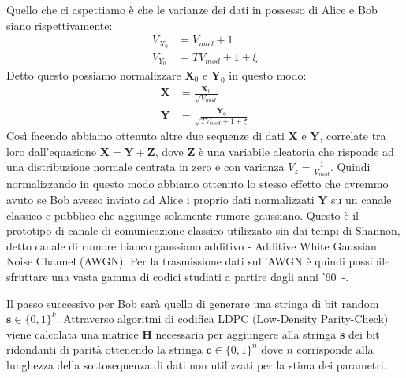 Quello che ci aspettiamo \`e che le varianze dei dati in possesso di Alice e Bob siano rispettivamente:
\begin{equation}
\begin{split}
V_{X_0} &= V_{mod} + 1 \\
V_{Y_0} &= T V_{mod} + 1 + \xi
\end{split}
\end{equation}
Detto questo possiamo normalizzare $\textbf{X}_0$ e $\textbf{Y}_0$ in questo modo:
\begin{equation}\label{eq:normalizzazione}
\begin{split}
\textbf{X} &= \frac{\textbf{X}_0}{\sqrt{V_{mod}}}\\
\textbf{Y} &= \frac{\textbf{Y}_0}{\sqrt{T V_{mod} + 1 + \xi}}
\end{split}
\end{equation}
Cos\`i facendo abbiamo ottenuto altre due sequenze di dati $\textbf{X}$ e $\textbf{Y}$, correlate tra loro dall'equazione $\textbf{X} = \textbf{Y} + \textbf{Z}$, dove $\textbf{Z}$ \`e una variabile aleatoria che risponde ad una distribuzione normale centrata in zero e con varianza $V_z = \frac{1}{V_{mod}}$. Quindi normalizzando in questo modo abbiamo ottenuto lo stesso effetto che avremmo avuto se Bob avesso inviato ad Alice i proprio dati normalizzati $\textbf{Y}$ su un canale classico e pubblico che aggiunge solamente rumore gaussiano\cite{milicevic_key_2018}. Questo è il prototipo di canale di comunicazione classico utilizzato sin dai tempi di Shannon, detto canale di rumore bianco gaussiano additivo - Additive White Gaussian Noise Channel (AWGN). Per la trasmissione dati sull'AWGN è quindi possibile sfruttare una vasta gamma di codici studiati a partire dagli anni '60~\cite{Gallager_1972}-\cite{richardson2008modern}. 

Il passo successivo per Bob sar\`a quello di generare una stringa di bit random $\textbf{s} \in \{0,1\}^k$. Attraverso algoritmi di codifica LDPC (Low-Density Parity-Check)~\cite{borwankar_low_nodate} viene calcolata una matrice \textbf{H} necessaria per aggiungere alla stringa \textbf{s} dei bit ridondanti di parit\`a ottenendo la stringa $\textbf{c} \in \{0,1\}^n$ dove $n$ corrisponde alla lunghezza della sottosequenza di dati non utilizzati per la stima dei parametri.

